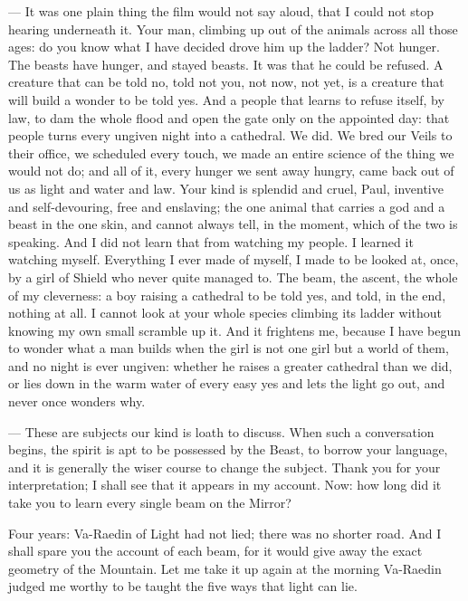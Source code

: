 \begin{room}
--- It was one plain thing the film would not say aloud, that I could not stop hearing underneath it. Your man, climbing up out of the animals across all those ages: do you know what I have decided drove him up the ladder? Not hunger. The beasts have hunger, and stayed beasts. It was that he could be refused. A creature that can be told no, told not you, not now, not yet, is a creature that will build a wonder to be told yes. And a people that learns to refuse itself, by law, to dam the whole flood and open the gate only on the appointed day: that people turns every ungiven night into a cathedral. We did. We bred our Veils to their office, we scheduled every touch, we made an entire science of the thing we would not do; and all of it, every hunger we sent away hungry, came back out of us as light and water and law. Your kind is splendid and cruel, Paul, inventive and self-devouring, free and enslaving; the one animal that carries a god and a beast in the one skin, and cannot always tell, in the moment, which of the two is speaking. And I did not learn that from watching my people. I learned it watching myself. Everything I ever made of myself, I made to be looked at, once, by a girl of Shield who never quite managed to. The beam, the ascent, the whole of my cleverness: a boy raising a cathedral to be told yes, and told, in the end, nothing at all. I cannot look at your whole species climbing its ladder without knowing my own small scramble up it. And it frightens me, because I have begun to wonder what a man builds when the girl is not one girl but a world of them, and no night is ever ungiven: whether he raises a greater cathedral than we did, or lies down in the warm water of every easy yes and lets the light go out, and never once wonders why.

--- These are subjects our kind is loath to discuss. When such a conversation begins, the spirit is apt to be possessed by the Beast, to borrow your language, and it is generally the wiser course to change the subject. Thank you for your interpretation; I shall see that it appears in my account. Now: how long did it take you to learn every single beam on the Mirror?

\end{room}

Four years: Va-Raedin of Light had not lied; there was no shorter road. And I shall spare you the account of each beam, for it would give away the exact geometry of the Mountain. Let me take it up again at the morning Va-Raedin judged me worthy to be taught the five ways that light can lie. \par

